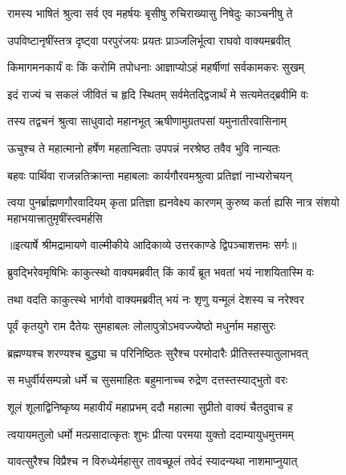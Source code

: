 \twolineshloka
{रामस्य भाषितं श्रुत्वा सर्व एव महर्षयः}
{बृसीषु रुचिराख्यासु निषेदुः काञ्चनीषु ते} %

\twolineshloka
{उपविष्टानृषींस्तत्र दृष्ट्वा परपुरंजयः}
{प्रयतः प्राञ्जलिर्भूत्वा राघवो वाक्यमब्रवीत्} %

\twolineshloka
{किमागमनकार्यं वः किं करोमि तपोधनाः}
{आज्ञाप्योऽहं महर्षीणां सर्वकामकरः सुखम्} %

\twolineshloka
{इदं राज्यं च सकलं जीवितं च हृदि स्थितम्}
{सर्वमेतद्द्विजार्थं मे सत्यमेतद्ब्रवीमि वः} %

\twolineshloka
{तस्य तद्वचनं श्रुत्वा साधुवादो महानभूत्}
{ऋषीणामुग्रतपसां यमुनातीरवासिनाम्} %

\twolineshloka
{ऊचुश्च ते महात्मानो हर्षेण महतान्विताः}
{उपपन्नं नरश्रेष्ठ तवैव भुवि नान्यतः} %

\twolineshloka
{बहवः पार्थिवा राजन्नतिक्रान्ता महाबलाः}
{कार्यगौरवमश्रुत्वा प्रतिज्ञां नाभ्यरोचयन्} %

\fourlineindentedshloka
{त्वया पुनर्ब्राह्मणगौरवादियम्}
{कृता प्रतिज्ञा ह्यनवेक्ष्य कारणम्}
{कुरुष्व कर्ता ह्यसि नात्र संशयो}
{महाभयात्त्रातुमृषींस्त्वमर्हसि} %


{॥इत्यार्षे श्रीमद्रामायणे वाल्मीकीये आदिकाव्ये उत्तरकाण्डे द्विपञ्चाशत्तमः सर्गः॥}


\twolineshloka
{ब्रुवद्भिरेवमृषिभिः काकुत्स्थो वाक्यमब्रवीत्}
{किं कार्यं ब्रूत भवतां भयं नाशयितास्मि वः} %

\twolineshloka
{तथा वदति काकुत्स्थे भार्गवो वाक्यमब्रवीत्}
{भयं नः शृणु यन्मूलं देशस्य च नरेश्वर} %

\twolineshloka
{पूर्वं कृतयुगे राम दैतेयः सुमहाबलः}
{लोलापुत्रोऽभवज्ज्येष्ठो मधुर्नाम महासुरः} %

\twolineshloka
{ब्रह्मण्यश्च शरण्यश्च बुद्ध्या च परिनिष्ठितः}
{सुरैश्च परमोदारैः प्रीतिस्तस्यातुलाभवत्} %

\twolineshloka
{स मधुर्वीर्यसम्पन्नो धर्मे च सुसमाहितः}
{बहुमानाच्च रुद्रेण दत्तस्तस्याद्भुतो वरः} %

\twolineshloka
{शूलं शूलाद्विनिष्कृष्य महावीर्यं महाप्रभम्}
{ददौ महात्मा सुप्रीतो वाक्यं चैतदुवाच ह} %

\twolineshloka
{त्वयायमतुलो धर्मो मत्प्रसादात्कृतः शुभः}
{प्रीत्या परमया युक्तो ददाम्यायुधमुत्तमम्} %

\twolineshloka
{यावत्सुरैश्च विप्रैश्च न विरुध्येर्महासुर}
{तावच्छूलं तवेदं स्यादन्यथा नाशमाप्नुयात्} %

